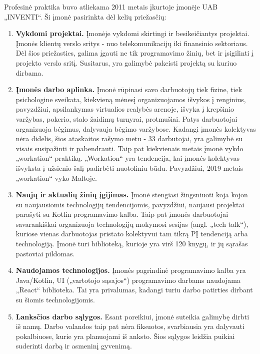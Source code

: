 Profesinė praktika buvo atliekama 2011 metais įkurtoje įmonėje UAB „INVENTI“. Ši įmonė pasirinkta dėl kelių priežasčių:

\begin{enumerate}
    \item \textbf{Vykdomi projektai.} Įmonėje vykdomi skirtingi ir besikeičiantys projektai. Įmonės klientų verslo sritys - nuo telekomunikacijų iki finansinio sektoriaus.
    Dėl šios priežasties, galima įgauti ne tik programavimo žinių, bet ir įsigilinti į projekto verslo sritį. Susitarus, yra galimybė pakeisti projektą su kuriuo dirbama.
    \item \textbf{Įmonės darbo aplinka.} Įmonė rūpinasi savo darbuotojų tiek fizine, tiek psichologine sveikata, kiekvieną mėnesį organizuojamos išvykos į renginius, pavyzdžiui,
    apsilankymas virtualios realybės arenoje, išvyka į krepšinio varžybas, pokerio, stalo žaidimų turnyrai, protmušiai. Patys darbuotojai organizuoja bėgimus, dalyvauja bėgimo
    varžybose. Kadangi įmonės kolektyvas nėra didelis, šios ataskaitos rašymo metu - 33 darbutojai, yra galimybė su visais susipažinti ir pabendrauti.
    Taip pat kiekvienais metais įmonė vykdo „workation“ praktiką. „Workation“ yra tendencija, kai įmonės kolektyvas išvyksta į užsienio šalį padirbėti nuotoliniu būdu.
    Pavyzdžiui, 2019 metais „workation“ vyko Maltoje.
    \item \textbf{Naujų ir aktualių žinių įgijimas.} Įmonė stengiasi žingsniuoti koja kojon su naujausiomis technologijų tendencijomis, pavyzdžiui, naujausi projektai parašyti su
    Kotlin programavimo kalba. Taip pat įmonės darbuotojai savarankiškai organizuoja technologijų mokymosi sesijas (angl. „tech talk“), kuriose vienas darbuotojas pristato kolektyvui
    tam tikrą PĮ tendenciją arba technologiją. Įmonė turi biblioteką, kurioje yra virš 120 knygų, ir jų sąrašas pastoviai pildomas.
    \item \textbf{Naudojamos technologijos.} Įmonės pagrindinė programavimo kalba yra Java/Kotlin, UI („vartotojo sąsajos“) programavimo darbams naudojama „React“ biblioteka. Tai yra privalumas,
    kadangi turiu darbo patirties dirbant su šiomis technologijomis.
    \item \textbf{Lanksčios darbo sąlygos.} Esant poreikiui, įmonė suteikia galimybę dirbti iš namų.
    Darbo valandos taip pat nėra fiksuotos, svarbiausia yra dalyvauti pokalbiuose, kurie yra planuojami iš anksto. Šios sąlygos leidžia
    puikiai suderinti darbą ir asmeninį gyvenimą.
\end{enumerate}

